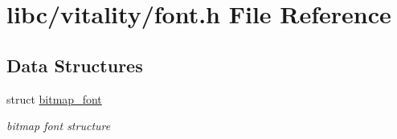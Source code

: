 \hypertarget{a00101}{}\section{libc/vitality/font.h File Reference}
\label{a00101}
\subsection*{Data Structures}
\begin{DoxyCompactItemize}
\item 
struct \hyperlink{a00162}{bitmap\+\_\+font}
\begin{DoxyCompactList}\small\item\em bitmap font structure \end{DoxyCompactList}\end{DoxyCompactItemize}
